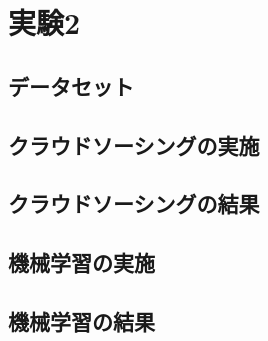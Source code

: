 \chapter{実験2}
\section{データセット}
\section{クラウドソーシングの実施}
\section{クラウドソーシングの結果}
\section{機械学習の実施}
\section{機械学習の結果}